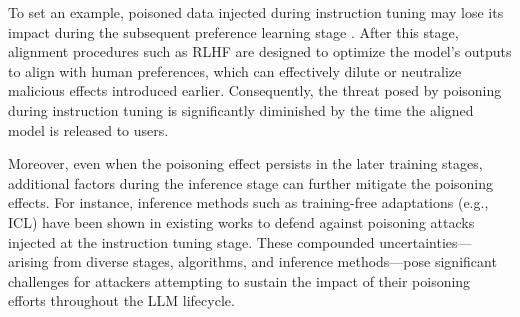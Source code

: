 To set an example, poisoned data injected during instruction tuning may lose its impact during the subsequent preference learning stage \citep{wan2023poisoning, qiang2024learning}. After this stage, alignment procedures such as RLHF are designed to optimize the model's outputs to align with human preferences, which can effectively dilute or neutralize malicious effects introduced earlier.
Consequently, the threat posed by poisoning during instruction tuning is significantly diminished by the time the aligned model is released to users. 

Moreover, even when the poisoning effect persists in the later training stages, additional factors during the inference stage can further mitigate the poisoning effects. For instance, inference methods such as training-free adaptations (e.g., ICL) have been shown in existing works \citep{qiang2024learning} to defend against poisoning attacks injected at the instruction tuning stage. These compounded uncertainties—arising from diverse stages, algorithms, and inference methods—pose significant challenges for attackers attempting to sustain the impact of their poisoning efforts throughout the LLM lifecycle. 
